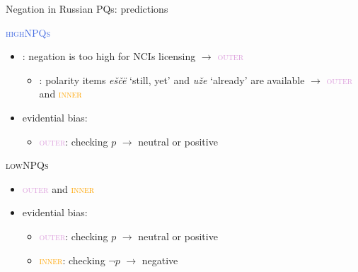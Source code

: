 \documentclass[xcolor=dvipsnames]{beamer}
\begin{document}
\begin{frame}{Negation in Russian PQs: predictions}
    \begin{large}
        \textcolor{RoyalBlue}{\textsc{highNPQs}} \\
    \end{large}
    \begin{itemize}
        \item \cite{Brown1995, Abels2005}: negation is too high for NCIs licensing $\rightarrow$
         \textcolor{Plum}{\textsc{outer}} 
         \begin{itemize}
            \item \cite{Zanon2023}: polarity items \textit{eščë} `still, yet' and \textit{uže} `already' 
            are available $\rightarrow$ \textcolor{Plum}{\textsc{outer}} and \textcolor{Orange}{\textsc{inner}}
         \end{itemize}
        \item evidential bias: 
        \begin{itemize}
            \item \textcolor{Plum}{\textsc{outer}}: checking $p$ $\rightarrow$ 
            neutral or positive 
        \end{itemize}
    
    \end{itemize}

    \begin{large}
        \textcolor{WildStrawberry}{\textsc{lowNPQs}} \\
    \end{large}

    \begin{itemize}
        \item \textcolor{Plum}{\textsc{outer}} and \textcolor{Orange}{\textsc{inner}}
    \end{itemize}
        \begin{itemize}
            \item evidential bias: 
            \begin{itemize}
                \item \textcolor{Plum}{\textsc{outer}}: checking $p$ $\rightarrow$ 
                neutral or positive 
                \item \textcolor{Orange}{\textsc{inner}}: checking $\neg p$ $\rightarrow$ 
                negative
            \end{itemize}
        \end{itemize}
\end{frame}
\end{document}
